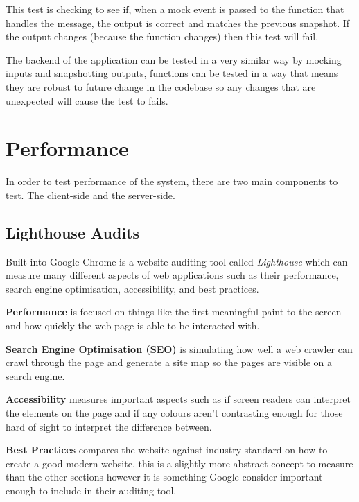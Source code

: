 This test is checking to see if, when a mock event is passed to the function that handles the message, the output is correct and matches the previous snapshot. If the output changes (because the function changes) then this test will fail.

The backend of the application can be tested in a very similar way by mocking inputs and snapshotting outputs, functions can be tested in a way that means they are robust to future change in the codebase so any changes that are unexpected will cause the test to fails.

\section{Performance}

In order to test performance of the system, there are two main components to test. The client-side and the server-side.

\subsection{Lighthouse Audits}

Built into Google Chrome is a website auditing tool called \textit{Lighthouse} \cite{google-lighthouse} which can measure many different aspects of web applications such as their performance, search engine optimisation, accessibility, and best practices. 

\textbf{Performance} is focused on things like the first meaningful paint to the screen and how quickly the web page is able to be interacted with. 

\textbf{Search Engine Optimisation (SEO)} is simulating how well a web crawler can crawl through the page and generate a site map so the pages are visible on a search engine. 

\textbf{Accessibility} measures important aspects such as if screen readers can interpret the elements on the page and if any colours aren't contrasting enough for those hard of sight to interpret the difference between.

\textbf{Best Practices} compares the website against industry standard on how to create a good modern website, this is a slightly more abstract concept to measure than the other sections however it is something Google consider important enough to include in their auditing tool. 

